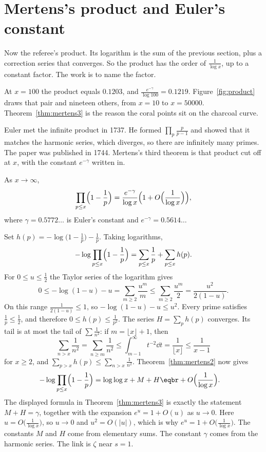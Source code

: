 \section{Mertens's product and Euler's constant}

Now the referee's product. Its logarithm is the sum of the previous section, plus a correction series that converges. So the product has the order of $\frac1{\log x}$, up to a constant factor. The work is to name the factor.

At $x=100$ the product equals $0.1203$, and $\frac{e^{-\gamma}}{\log 100}=0.1219$. Figure~\ref{fig:product} draws that pair and nineteen others, from $x=10$ to $x=50000$. Theorem~\ref{thm:mertens3} is the reason the coral points sit on the charcoal curve.

Euler met the infinite product in 1737. He formed $\prod_p\frac{p}{p-1}$ and showed that it matches the harmonic series, which diverges, so there are infinitely many primes. The paper was published in 1744. Mertens's third theorem is that product cut off at $x$, with the constant $e^{-\gamma}$ written in.

\begin{theorem}[Mertens, 1874]\label{thm:mertens3}
As $x\to\infty$,
\[
\prod_{p\le x}\Bigl(1-\frac1p\Bigr)=\frac{e^{-\gamma}}{\log x}\Bigl(1+O\Bigl(\frac1{\log x}\Bigr)\Bigr),
\]
where $\gamma=0.5772\ldots$ is Euler's constant and $e^{-\gamma}=0.5614\ldots$
\end{theorem}

Set $h(p)=-\log\bigl(1-\frac1p\bigr)-\frac1p$. Taking logarithms,
\[
-\log\prod_{p\le x}\Bigl(1-\frac1p\Bigr)=\sum_{p\le x}\frac1p+\sum_{p\le x}h(p).
\]
For $0\le u\le\frac12$ the Taylor series of the logarithm gives
\[
0\le-\log(1-u)-u=\sum_{m\ge 2}\frac{u^m}m\le\sum_{m\ge 2}\frac{u^m}2=\frac{u^2}{2(1-u)}.
\]
On this range $\frac1{2(1-u)}\le 1$, so $-\log(1-u)-u\le u^2$. Every prime satisfies $\frac1p\le\frac12$, and therefore $0\le h(p)\le\frac1{p^2}$. The series $H=\sum_ph(p)$ converges. Its tail is at most the tail of $\sum\frac1{n^2}$: if $m=\lfloor x\rfloor+1$, then
\[
\sum_{n>x}\frac1{n^2}=\sum_{n\ge m}\frac1{n^2}\le\int_{m-1}^\infty t^{-2}\dd t=\frac1{\lfloor x\rfloor}\le\frac1{x-1}
\]
for $x\ge 2$, and $\sum_{p>x}h(p)\le\sum_{n>x}\frac1{n^2}$. Theorem~\ref{thm:mertens2} now gives
\[
\begin{aligned}-\log\prod_{p\le x}\Bigl(1-\frac1p\Bigr)&=\log\log x+M+H\eqbr+O\Bigl(\frac1{\log x}\Bigr).\end{aligned}
\]
The displayed formula in Theorem~\ref{thm:mertens3} is exactly the statement $M+H=\gamma$, together with the expansion $e^u=1+O(u)$ as $u\to 0$. Here $u=O\bigl(\frac1{\log x}\bigr)$, so $u\to 0$ and $u^2=O(|u|)$, which is why $e^u=1+O\bigl(\frac1{\log x}\bigr)$. The constants $M$ and $H$ come from elementary sums. The constant $\gamma$ comes from the harmonic series. The link is $\zeta$ near $s=1$.

